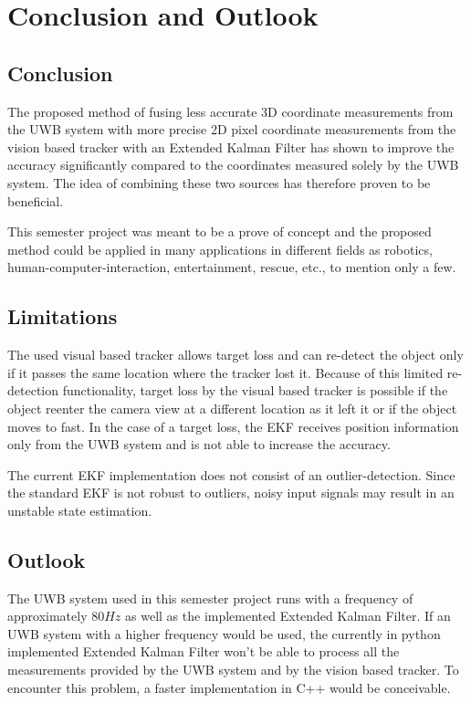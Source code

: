 \chapter{Conclusion and Outlook}

\section{Conclusion}
The proposed method of fusing less accurate 3D coordinate measurements from the \ac{UWB} system with more precise 2D pixel coordinate measurements from the vision based tracker with an Extended Kalman Filter has shown to improve the accuracy significantly compared to the coordinates measured solely by the \ac{UWB} system. The idea of combining these two sources has therefore proven to be beneficial.

This semester project was meant to be a prove of concept and the proposed method could be applied in many applications in different fields as robotics, human-computer-interaction, entertainment, rescue, etc., to mention only a few.

\section{Limitations}
The used visual based tracker allows target loss and can re-detect the object only if it passes the same location where the tracker lost it. Because of this limited re-detection functionality, target loss by the visual based tracker is possible if the object reenter the camera view at a different location as it left it or if the object moves to fast. In the case of a target loss, the \ac{EKF} receives position information only from the \ac{UWB} system and is not able to increase the accuracy.

The current \ac{EKF} implementation does not consist of an outlier-detection. Since the standard \ac{EKF} is not robust to outliers, noisy input signals may result in an unstable state estimation. 


\section{Outlook}\textsl{}
The \ac{UWB} system used in this semester project runs with a frequency of approximately $80\mathit{Hz}$ as well as the implemented Extended Kalman Filter. If an \ac{UWB} system with a higher frequency would be used, the currently in python implemented Extended Kalman Filter won't be able to process all the measurements provided by the \ac{UWB} system and by the vision based tracker. To encounter this problem, a faster implementation in C++ would be conceivable.

